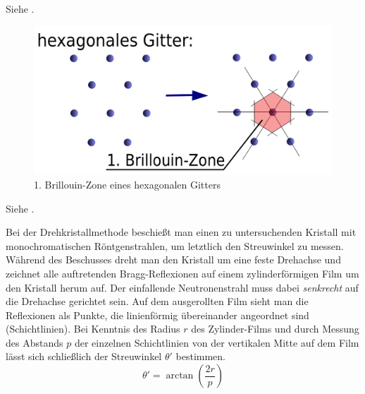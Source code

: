 \label{q:74}

Siehe .

\label{q:75}

\begin{figure}[H]
    \centering
    \begin{samepage}
        \includegraphics[width=0.6\linewidth]{resources/31-10-2013/BZ1_hexagonal.png}
        \caption{1. Brillouin-Zone eines hexagonalen Gitters}
    \end{samepage}
\end{figure}

\label{q:76}

Siehe .

\label{q:77}

Bei der Drehkristallmethode beschießt man einen zu untersuchenden Kristall mit monochromatischen Röntgenstrahlen, um letztlich den Streuwinkel zu messen. Während des Beschusses dreht man den Kristall um eine feste Drehachse und zeichnet alle auftretenden Bragg-Reflexionen auf einem zylinderförmigen Film um den Kristall herum auf. Der einfallende Neutronenstrahl muss dabei \textit{senkrecht} auf die Drehachse gerichtet sein. Auf dem ausgerollten Film sieht man die Reflexionen als Punkte, die linienförmig übereinander angeordnet sind (Schichtlinien). Bei Kenntnis des Radius $r$ des Zylinder-Films und durch Messung des Abstands $p$ der einzelnen Schichtlinien von der vertikalen Mitte auf dem Film lässt sich schließlich der Streuwinkel $\theta'$ bestimmen.
\begin{equation}
    \label{eq:drehkristallmethode}
    \theta' = \arctan\left(\frac{2r}{p}\right)
\end{equation}

\label{q:78}

